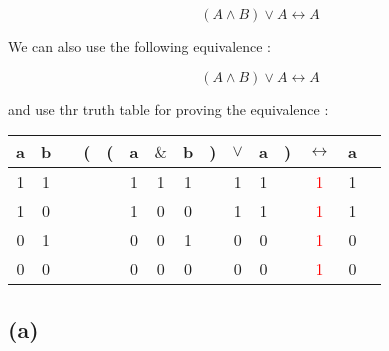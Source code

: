 \documentclass[a4paper,11pt]{report}
\begin{document}
\[
  (A \wedge B) \vee A \leftrightarrow A
\]

We can also use the following equivalence :

\[
  (A \wedge B) \vee A \leftrightarrow A
\]

and use thr truth table for proving the equivalence :

\begin{center}
  \begin{tabular}{@{ }c@{ }@{ }c | c@{ }@{}c@{}@{}c@{}@{ }c@{ }@{ }c@{ }@{ }c@{ }@{}c@{}@{ }c@{ }@{ }c@{ }@{}c@{}@{ }c@{ }@{ }c@{ }@{ }c}
    a & b &  & ( & ( & a & $\&$ & b & ) & $\lor$ & a & ) & $\leftrightarrow$ & a & \\
    \hline 
    1 & 1 &  &  &  & 1 & 1 & 1 &  & 1 & 1 &  & \textcolor{red}{1} & 1 & \\
    1 & 0 &  &  &  & 1 & 0 & 0 &  & 1 & 1 &  & \textcolor{red}{1} & 1 & \\
    0 & 1 &  &  &  & 0 & 0 & 1 &  & 0 & 0 &  & \textcolor{red}{1} & 0 & \\
    0 & 0 &  &  &  & 0 & 0 & 0 &  & 0 & 0 &  & \textcolor{red}{1} & 0 & \\
  \end{tabular}
\end{center}

\subsection*{(a)}
\end{document}
